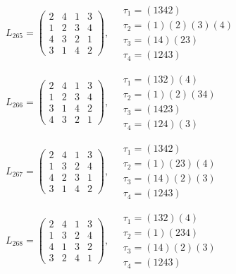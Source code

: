 $L_{265} = \begin{pmatrix} 2 & 4 & 1 & 3 \\ 1 & 2 & 3 & 4 \\ 4 & 3 & 2 & 1 \\ 3 & 1 & 4 & 2 \end{pmatrix}, \quad \begin{matrix} \tau_{1} = (1 3 4 2) \\ \tau_{2} = (1)(2)(3)(4) \\ \tau_{3} = (1 4)(2 3) \\ \tau_{4} = (1 2 4 3) \end{matrix}$

$L_{266} = \begin{pmatrix} 2 & 4 & 1 & 3 \\ 1 & 2 & 3 & 4 \\ 3 & 1 & 4 & 2 \\ 4 & 3 & 2 & 1 \end{pmatrix}, \quad \begin{matrix} \tau_{1} = (1 3 2)(4) \\ \tau_{2} = (1)(2)(3 4) \\ \tau_{3} = (1 4 2 3) \\ \tau_{4} = (1 2 4)(3) \end{matrix}$

$L_{267} = \begin{pmatrix} 2 & 4 & 1 & 3 \\ 1 & 3 & 2 & 4 \\ 4 & 2 & 3 & 1 \\ 3 & 1 & 4 & 2 \end{pmatrix}, \quad \begin{matrix} \tau_{1} = (1 3 4 2) \\ \tau_{2} = (1)(2 3)(4) \\ \tau_{3} = (1 4)(2)(3) \\ \tau_{4} = (1 2 4 3) \end{matrix}$

$L_{268} = \begin{pmatrix} 2 & 4 & 1 & 3 \\ 1 & 3 & 2 & 4 \\ 4 & 1 & 3 & 2 \\ 3 & 2 & 4 & 1 \end{pmatrix}, \quad \begin{matrix} \tau_{1} = (1 3 2)(4) \\ \tau_{2} = (1)(2 3 4) \\ \tau_{3} = (1 4)(2)(3) \\ \tau_{4} = (1 2 4 3) \end{matrix}$

